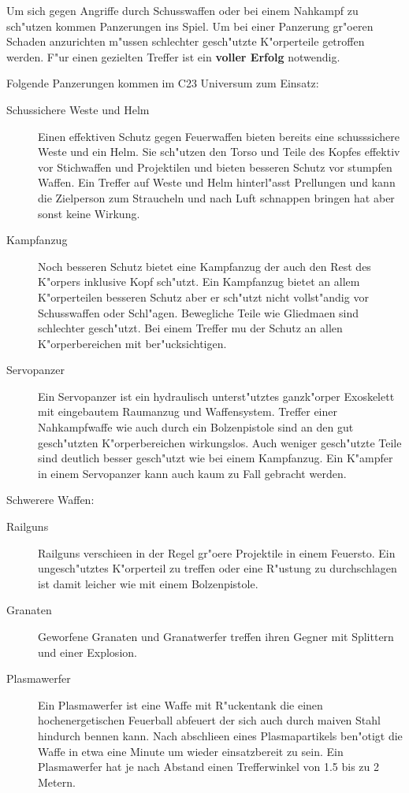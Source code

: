Um sich gegen Angriffe durch Schusswaffen oder bei einem Nahkampf zu sch"utzen kommen Panzerungen ins Spiel. Um bei einer Panzerung gr"o\3eren Schaden anzurichten m"ussen schlechter gesch"utzte K"orperteile getroffen werden. F"ur einen gezielten Treffer ist ein \textbf{voller Erfolg} notwendig.

Folgende Panzerungen kommen im C23 Universum zum Einsatz:

\begin{description}
    \item[Schussichere Weste und Helm] Einen effektiven Schutz gegen Feuerwaffen bieten bereits eine schusssichere Weste und ein Helm. Sie 
        sch"utzen den Torso und Teile des Kopfes effektiv vor Stichwaffen und Projektilen und bieten besseren Schutz vor stumpfen Waffen. Ein Treffer auf Weste und Helm hinterl"asst Prellungen und kann die Zielperson zum Straucheln und nach Luft schnappen bringen hat aber sonst keine Wirkung.
    \item[Kampfanzug] Noch besseren Schutz bietet eine Kampfanzug der auch den Rest des K"orpers inklusive Kopf sch"utzt. Ein Kampfanzug 
        bietet an allem K"orperteilen besseren Schutz aber er sch"utzt nicht vollst"andig vor Schusswaffen oder Schl"agen. Bewegliche Teile wie Gliedma\3en sind schlechter gesch"utzt. Bei einem Treffer mu\3 der Schutz an allen K"orperbereichen mit ber"ucksichtigen.
    \item[Servopanzer] Ein Servopanzer ist ein hydraulisch unterst"utztes ganzk"orper Exoskelett mit eingebautem Raumanzug und 
        Waffensystem. Treffer einer Nahkampfwaffe wie auch durch ein Bolzenpistole sind an den gut gesch"utzten K"orperbereichen wirkungslos. Auch weniger gesch"utzte Teile sind deutlich besser gesch"utzt wie bei einem Kampfanzug. Ein K"ampfer in einem Servopanzer kann auch kaum zu Fall gebracht werden.
\end{description}

Schwerere Waffen:

\begin{description}
    \item[Railguns] Railguns verschie\3en in der Regel gr"o\3ere Projektile in einem Feuersto\3. Ein ungesch"utztes K"orperteil zu treffen 
        oder eine R"ustung zu durchschlagen ist damit leicher wie mit einem Bolzenpistole.
    \item[Granaten] Geworfene Granaten und Granatwerfer treffen ihren Gegner mit Splittern und einer Explosion.
    \item[Plasmawerfer] Ein Plasmawerfer ist eine Waffe mit R"uckentank die einen hochenergetischen Feuerball abfeuert der sich auch durch 
        ma\3iven Stahl hindurch bennen kann. Nach abschlie\3en eines Plasmapartikels ben"otigt die Waffe in etwa eine Minute um wieder einsatzbereit zu sein. Ein Plasmawerfer hat je nach Abstand einen Trefferwinkel von 1.5 bis zu 2 Metern.
\end{description}

